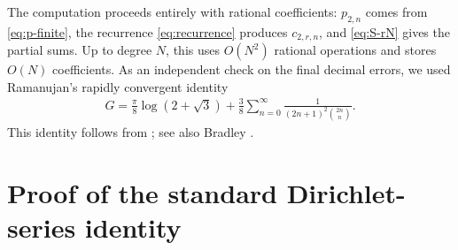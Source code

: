 \documentclass[11pt,reqno]{amsart}
\numberwithin{equation}{section}
\theoremstyle{definition}
\theoremstyle{remark}
\newcommand{\Gconst}{G}
\begin{document}
The computation proceeds entirely with rational coefficients:
\(p_{2,n}\) comes from \eqref{eq:p-finite}, the recurrence
\eqref{eq:recurrence} produces \(c_{2,r,n}\), and
\eqref{eq:S-rN} gives the partial sums.  Up to degree \(N\), this uses
\(O(N^2)\) rational operations and stores \(O(N)\) coefficients.  As
an independent check on the final decimal errors, we used Ramanujan's
rapidly convergent identity
\begin{align}\label{eq:independent-G}
 \Gconst
 =
 \frac{\pi}{8}\log(2+\sqrt3)
 +\frac38\sum_{n=0}^{\infty}
 \frac1{(2n+1)^2\binom{2n}{n}}.
\end{align}
This identity follows from
\cite[Eqs.~(7)--(8)]{Ramanujan1915}; see also
Bradley \cite[Eq.~(2)]{Bradley1999}.
\appendix

\section{Proof of the standard Dirichlet-series identity}
\label{app:standard-L-proof}
\end{document}
